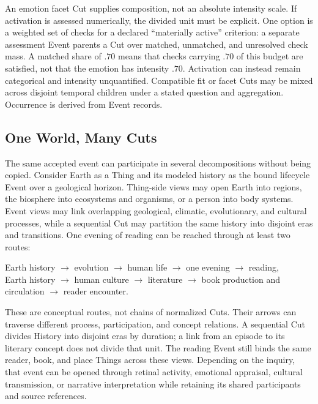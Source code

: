 \documentclass[11pt,a4paper]{article}
\begin{document}
An emotion facet Cut supplies composition, not an absolute intensity scale. If
activation is assessed numerically, the divided unit must be explicit. One
option is a weighted set of checks for a declared ``materially active''
criterion: a separate assessment Event parents a Cut over matched, unmatched,
and unresolved check mass. A matched share of $.70$ means that checks carrying
$.70$ of this budget are satisfied, not that the emotion has intensity $.70$.
Activation can instead remain categorical and intensity unquantified.
Compatible fit or facet Cuts may be mixed across disjoint temporal children
under a stated question and aggregation. Occurrence is derived from Event
records.

\subsection{One World, Many Cuts}

The same accepted event can participate in several decompositions without
being copied. Consider Earth as a Thing and its modeled history as the bound
lifecycle Event over a geological horizon. Thing-side views may open Earth into
regions, the biosphere into ecosystems and organisms, or a person into body
systems. Event views may link overlapping geological, climatic, evolutionary,
and cultural processes, while a sequential Cut may partition the same history
into disjoint eras and transitions. One evening of reading can be reached
through at least two routes:

\begin{center}
\small
Earth history $\rightarrow$ evolution $\rightarrow$ human life
$\rightarrow$ one evening $\rightarrow$ reading,\\
Earth history $\rightarrow$ human culture $\rightarrow$ literature
$\rightarrow$ book production and circulation $\rightarrow$ reader encounter.
\end{center}

These are conceptual routes, not chains of normalized Cuts. Their arrows can
traverse different process, participation, and concept relations. A sequential
Cut divides History into disjoint eras by duration; a link from an episode to
its literary concept does not divide that unit. The reading Event still binds
the same reader, book, and place Things across these views.
Depending on the inquiry, that event can be opened through retinal activity,
emotional appraisal, cultural transmission, or narrative interpretation while
retaining its shared participants and source references.
\end{document}

